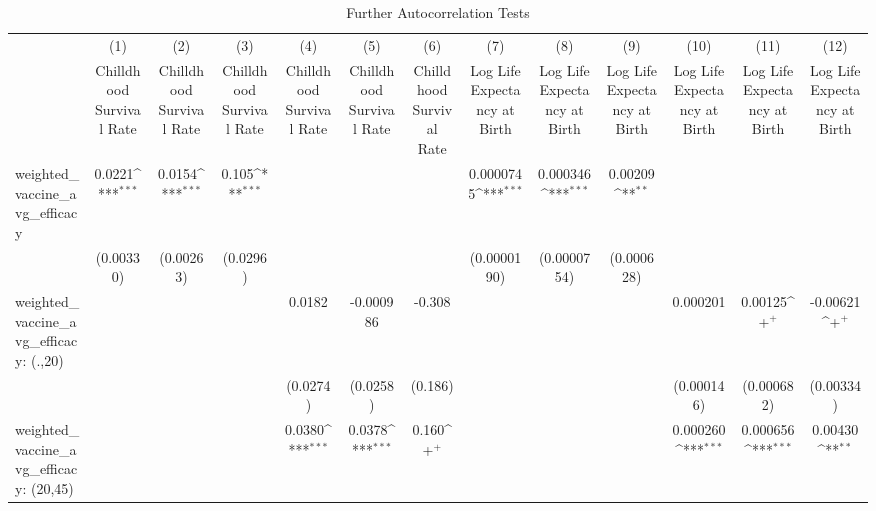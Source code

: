 \begin{table}[htbp]\centering
\def\sym#1{\ifmmode^{#1}\else\(^{#1}\)\fi}
\caption{Further Autocorrelation Tests}
\begin{tabular}{l*{12}{c}}
\toprule
                &\multicolumn{1}{c}{(1)}&\multicolumn{1}{c}{(2)}&\multicolumn{1}{c}{(3)}&\multicolumn{1}{c}{(4)}&\multicolumn{1}{c}{(5)}&\multicolumn{1}{c}{(6)}&\multicolumn{1}{c}{(7)}&\multicolumn{1}{c}{(8)}&\multicolumn{1}{c}{(9)}&\multicolumn{1}{c}{(10)}&\multicolumn{1}{c}{(11)}&\multicolumn{1}{c}{(12)}\\
                &\multicolumn{1}{c}{Chilldhood Survival Rate}&\multicolumn{1}{c}{Chilldhood Survival Rate}&\multicolumn{1}{c}{Chilldhood Survival Rate}&\multicolumn{1}{c}{Chilldhood Survival Rate}&\multicolumn{1}{c}{Chilldhood Survival Rate}&\multicolumn{1}{c}{Chilldhood Survival Rate}&\multicolumn{1}{c}{Log Life Expectancy at Birth}&\multicolumn{1}{c}{Log Life Expectancy at Birth}&\multicolumn{1}{c}{Log Life Expectancy at Birth}&\multicolumn{1}{c}{Log Life Expectancy at Birth}&\multicolumn{1}{c}{Log Life Expectancy at Birth}&\multicolumn{1}{c}{Log Life Expectancy at Birth}\\
\midrule
weighted\_vaccine\_avg\_efficacy&   0.0221\sym{***}&   0.0154\sym{***}&    0.105\sym{***}&                  &                  &                  &0.0000745\sym{***}& 0.000346\sym{***}&  0.00209\sym{**} &                  &                  &                  \\
                &(0.00330)         &(0.00263)         & (0.0296)         &                  &                  &                  &(0.0000190)         &(0.0000754)         &(0.000628)         &                  &                  &                  \\
\addlinespace
weighted\_vaccine\_avg\_efficacy: (.,20)&                  &                  &                  &   0.0182         &-0.000986         &   -0.308         &                  &                  &                  & 0.000201         &  0.00125\sym{+}  & -0.00621\sym{+}  \\
                &                  &                  &                  & (0.0274)         & (0.0258)         &  (0.186)         &                  &                  &                  &(0.000146)         &(0.000682)         &(0.00334)         \\
\addlinespace
weighted\_vaccine\_avg\_efficacy: (20,45)&                  &                  &                  &   0.0380\sym{***}&   0.0378\sym{***}&    0.160\sym{+}  &                  &                  &                  & 0.000260\sym{***}& 0.000656\sym{***}&  0.00430\sym{**} \\

\end{tabular}
\end{table}
